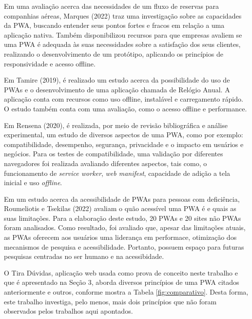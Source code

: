 \documentclass[12pt]{article}
\begin{document}
Em uma avaliação acerca das necessidades de um fluxo de reservas para companhias aéreas, Marques (2022) traz uma investigação sobre as capacidades da PWA, buscando entender seus pontos fortes e fracos em relação a uma aplicação nativa. Também disponibilizou recursos para que empresas avaliem se uma PWA é adequada às suas necessidades sobre a satisfação dos seus clientes, realizando o desenvolvimento de um protótipo, aplicando os princípios de responsividade e acesso offline.

Em Tamire (2019), é realizado um estudo acerca da possibilidade do uso de PWAs e o desenvolvimento de uma aplicação chamada de Relógio Anual. A  aplicação conta com recursos como uso offline, instalável e carregamento rápido. O estudo também conta com uma avaliação, como o acesso offline e performance.

Em Rensena (2020), é realizada, por meio de revisão bibliográfica e análise experimental, um estudo de diversos aspectos de uma PWA, como por exemplo: compatibilidade, desempenho, segurança, privacidade e o impacto em usuários e negócios. Para os testes de compatibilidade, uma validação por diferentes navegadores foi realizada avaliando diferentes aspectos, tais como, o funcionamento de \textit{service worker}, \textit{web manifest}, capacidade de adição a tela inicial e uso \textit{offline}. 

Em um estudo acerca da acessibilidade de PWAs para pessoas com deficiência, Roumeliotis e Tsekilas (2022) avaliam o quão acessível uma PWA é e quais as suas limitações. Para a elaboração deste estudo, 20 PWAs e 20 sites não PWAs foram analisados. Como resultado, foi avaliado que, apesar das limitações atuais, as PWAs oferecem aos usuários uma liderança em performace, otimização dos mecanismos de pesquisa e acessibilidade. Portanto, possuem espaço para futuras pesquisas centradas no ser humano e na acessibidade.

O Tira Dúvidas, aplicação web usada como prova de conceito neste trabalho e que é apresentado na Seção 3, aborda diversos princípios de uma PWA citados anteriormente e outros, conforme mostra a Tabela \ref{fig:comparativo}. Desta forma, este trabalho investiga, pelo menos, mais dois princípios que não foram observados pelos trabalhos aqui apontados.
\end{document}

